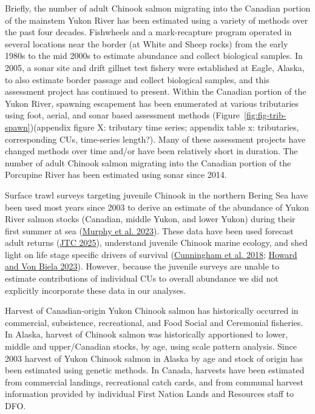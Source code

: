 \documentclass[11pt]{book}
\begin{document}
Briefly, the number of adult Chinook salmon migrating into the Canadian portion of the mainstem Yukon River has been estimated using a variety of methods over the past four decades. Fishwheels and a mark-recapture program operated in several locations near the border (at White and Sheep rocks) from the early 1980s to the mid 2000s to estimate abundance and collect biological samples. In 2005, a sonar site and drift gillnet test fishery were established at Eagle, Alaska, to also estimate border passage and collect biological samples, and this assessment project has continued to present. Within the Canadian portion of the Yukon River, spawning escapement has been enumerated at various tributaries using foot, aerial, and sonar based assessment methods (Figure~\ref{fig:fig-trib-spawn})(appendix figure X: tributary time series; appendix table x: tributaries, corresponding CUs, time-series length?). Many of these assessment projects have changed methods over time and/or have been relatively short in duration. The number of adult Chinook salmon migrating into the Canadian portion of the Porcupine River has been estimated using sonar since 2014.

Surface trawl surveys targeting juvenile Chinook in the northern Bering Sea have been used most years since 2003 to derive an estimate of the abundance of Yukon River salmon stocks (Canadian, middle Yukon, and lower Yukon) during their first summer at sea (\protect\hyperlink{ref-murphy2023}{Murphy et al. 2023}). These data have been used forecast adult returns (\protect\hyperlink{ref-JTC2025Report}{JTC 2025}), understand juvenile Chinook marine ecology, and shed light on life stage specific drivers of survival (\protect\hyperlink{ref-cunningham2018}{Cunningham et al. 2018}; \protect\hyperlink{ref-howard2023}{Howard and Von Biela 2023}). However, because the juvenile surveys are unable to estimate contributions of individual CUs to overall abundance we did not explicitly incorporate these data in our analyses.

Harvest of Canadian-origin Yukon Chinook salmon has historically occurred in commercial, subsistence, recreational, and Food Social and Ceremonial fisheries. In Alaska, harvest of Chinook salmon was historically apportioned to lower, middle and upper/Canadian stocks, by age, using scale pattern analysis. Since 2003 harvest of Yukon Chinook salmon in Alaska by age and stock of origin has been estimated using genetic methods. In Canada, harvests have been estimated from commercial landings, recreational catch cards, and from communal harvest information provided by individual First Nation Lands and Resources staff to DFO.
\end{document}
